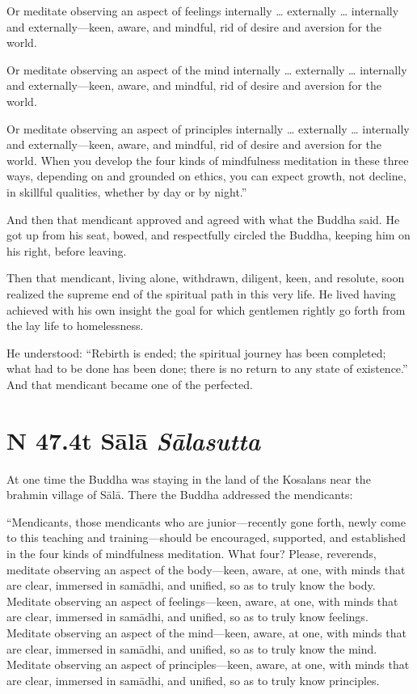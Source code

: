 \documentclass[12pt,openany]{book}%
\newcommand*{\suttatitleacronym}[1]{\smaller[2]{#1}\vspace*{.3em}}
\newcommand*{\suttatitletranslation}[1]{\linebreak{#1}}
\newcommand*{\suttatitleroot}[1]{\linebreak\smaller[2]\itshape{#1}}
\newcommand*{\tocacronym}[1]{\hspace*{-3.3em}{#1}\quad}
\newcommand*{\toctranslation}[1]{#1}
\newcommand*{\tocroot}[1]{(\textit{#1})}
\begin{document}
Or meditate observing an aspect of feelings internally … externally … internally and externally—keen, aware, and mindful, rid of desire and aversion for the world. 

Or meditate observing an aspect of the mind internally … externally … internally and externally—keen, aware, and mindful, rid of desire and aversion for the world. 

Or meditate observing an aspect of principles internally … externally … internally and externally—keen, aware, and mindful, rid of desire and aversion for the world. When you develop the four kinds of mindfulness meditation in these three ways, depending on and grounded on ethics, you can expect growth, not decline, in skillful qualities, whether by day or by night.” 

And then that mendicant approved and agreed with what the Buddha said. He got up from his seat, bowed, and respectfully circled the Buddha, keeping him on his right, before leaving. 

Then that mendicant, living alone, withdrawn, diligent, keen, and resolute, soon realized the supreme end of the spiritual path in this very life. He lived having achieved with his own insight the goal for which gentlemen rightly go forth from the lay life to homelessness. 

He understood: “Rebirth is ended; the spiritual journey has been completed; what had to be done has been done; there is no return to any state of existence.” And that mendicant became one of the perfected. 

%
\section*{{\suttatitleacronym SN 47.4}{\suttatitletranslation At Sālā }{\suttatitleroot Sālasutta}}
\addcontentsline{toc}{section}{\tocacronym{SN 47.4} \toctranslation{At Sālā } \tocroot{Sālasutta}}

At one time the Buddha was staying in the land of the Kosalans near the brahmin village of \textsanskrit{Sālā}. There the Buddha addressed the mendicants: 

“Mendicants, those mendicants who are junior—recently gone forth, newly come to this teaching and training—should be encouraged, supported, and established in the four kinds of mindfulness meditation. What four? Please, reverends, meditate observing an aspect of the body—keen, aware, at one, with minds that are clear, immersed in \textsanskrit{samādhi}, and unified, so as to truly know the body. Meditate observing an aspect of feelings—keen, aware, at one, with minds that are clear, immersed in \textsanskrit{samādhi}, and unified, so as to truly know feelings. Meditate observing an aspect of the mind—keen, aware, at one, with minds that are clear, immersed in \textsanskrit{samādhi}, and unified, so as to truly know the mind. Meditate observing an aspect of principles—keen, aware, at one, with minds that are clear, immersed in \textsanskrit{samādhi}, and unified, so as to truly know principles. 
\end{document}
